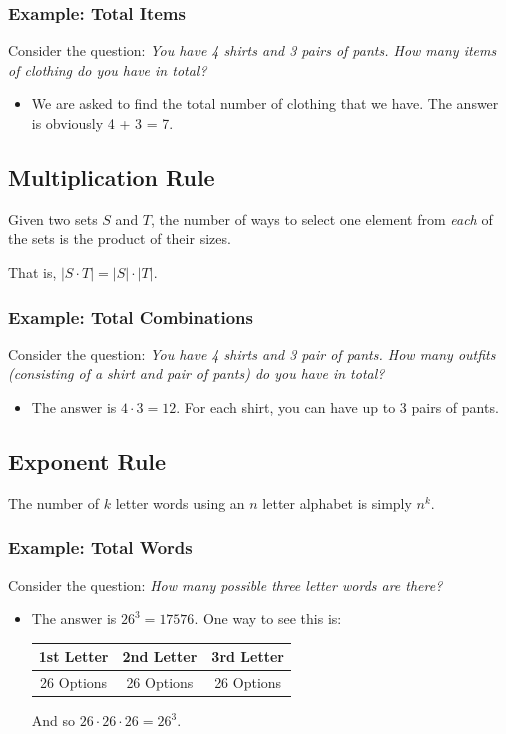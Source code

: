 \documentclass[letterpaper]{article}
\begin{document}
\subsubsection{Example: Total Items}
Consider the question: \emph{You have 4 shirts and 3 pairs of pants. How many items of clothing do you have in total?} 
\begin{itemize}
    \item We are asked to find the total number of clothing that we have. The answer is obviously 4 + 3 = 7.
\end{itemize}

\subsection{Multiplication Rule}
Given two sets $S$ and $T$, the number of ways to select one element from \emph{each} of the sets is the product of their sizes.

\bigskip 

That is, $|S \cdot T| = |S| \cdot |T|$.

\subsubsection{Example: Total Combinations}
Consider the question: \emph{You have 4 shirts and 3 pair of pants. How many outfits (consisting of a shirt and pair of pants) do you have in total?} 

\begin{itemize}
    \item The answer is $4 \cdot 3 = 12$. For each shirt, you can have up to 3 pairs of pants. 
\end{itemize}

\subsection{Exponent Rule}
The number of $k$ letter words using an $n$ letter alphabet is simply $n^k$. 

\subsubsection{Example: Total Words}
Consider the question: \emph{How many possible three letter words are there?} 

\begin{itemize}
    \item The answer is $26^3 = 17576$. One way to see this is:
    \begin{center}
        \begin{tabular}{c|c|c}
            1st Letter & 2nd Letter & 3rd Letter \\ 
            \hline 
            26 Options & 26 Options & 26 Options
        \end{tabular}
    \end{center}
    And so $26 \cdot 26 \cdot 26 = 26^3$.
\end{itemize}
\end{document}
